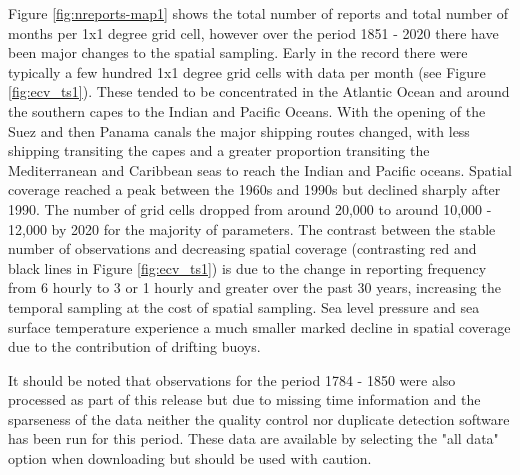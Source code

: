 Figure \ref{fig:nreports-map1} shows the total number of reports and total number of months per 1x1 degree grid cell, however over the period 1851 - 2020 there have been major changes to the spatial sampling.
Early in the record there were typically a few hundred 1x1 degree grid cells with data per month (see Figure \ref{fig:ecv_ts1}).
These tended to be concentrated in the Atlantic Ocean and around the southern capes to the Indian and Pacific Oceans.
With the opening of the Suez and then Panama canals the major shipping routes changed, with less shipping transiting the capes and a greater proportion transiting the Mediterranean and Caribbean seas to reach the Indian and Pacific oceans.
Spatial coverage reached a peak between the 1960s and 1990s but declined sharply after 1990.
The number of grid cells dropped from around 20,000 to around 10,000 - 12,000 by 2020 for the majority of parameters. 
The contrast between the stable number of observations and decreasing spatial coverage (contrasting red and black lines in Figure \ref{fig:ecv_ts1}) is due to the change in reporting frequency from 6 hourly to 3 or 1 hourly and greater over the past 30 years, increasing the temporal sampling at the cost of spatial sampling.
Sea level pressure and sea surface temperature experience a much smaller marked decline in spatial coverage due to the contribution of drifting buoys.

It should be noted that observations for the period 1784 - 1850 were also processed as part of this release but due to missing time information and the sparseness of the data neither the quality control nor duplicate detection software has been run for this period. These data are available by selecting the "all data" option when downloading but should be used with caution.


